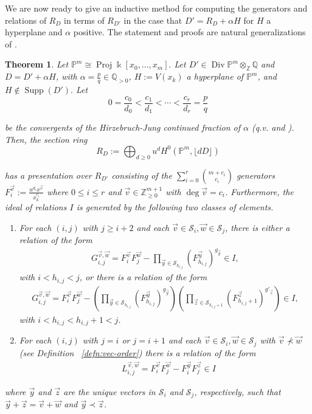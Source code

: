 \documentclass{amsart}
\theoremstyle{plain}
\newtheorem{thm}{Theorem}[subsection]
\theoremstyle{definition}
\theoremstyle{remark}
\numberwithin{equation}{section}
\newcommand\bq{{\mathbb Q}}
\newcommand\bp{{\mathbb P}}
\newcommand\bz{{\mathbb Z}}
\newcommand\bk{{\Bbbk}}
\DeclareMathOperator\di{Div}
\newcommand\mss{\mathscr{S}}
\DeclareMathOperator{\supp}{Supp}
\DeclareMathOperator{\proj}{Proj}
\begin{document}
We are now ready to give an inductive method for computing
the generators and relations of $R_D$ in terms of $R_{D'}$ 
in the case that $D' = R_D + \alpha H$ for $H$ a hyperplane and
$\alpha$ positive.
The statement and proofs are natural generalizations of
\cite[Theorem 6]{dorney:canonical}.


\begin{thm}
\label{thm:proj-one-point}
Let $\bp^m \cong \proj \bk [x_0, \ldots, x_m].$ Let $D' \in \di \bp^m \otimes_\bz \bq$ and $D = D' + \alpha H$, with $\alpha =
\frac{p}{q} \in \bq_{>0}$, $H := V(x_k)$ a hyperplane of $\bp^m$,
and $H \notin \supp(D').$
Let
\[
	0 = \frac{c_0}{d_0} <
	\frac{c_1}{d_1} < \cdots < \frac{c_r}{d_r} = \frac{p}{q}
\]

\noindent
be the convergents of the Hirzebruch-Jung continued fraction of
$\alpha$ (q.v. \cite[Section 2]{voight:cf} and \cite[Section 3]{hirzebruch:cf}). Then, the section ring
\[
	R_D := \bigoplus_{d \geq 0} u^d H^0(\bp^m, \lfloor dD \rfloor)
\]

\noindent
has a presentation over $R_{D'}$ consisting of the $\sum_{i = 0}^{r}
{{m + c_i} \choose {c_i}}$ generators $F_i^{\vec{v}} := \frac{u^{d_i}
x^{\vec{v}}}{x_k^{c_i}}$ where $0 \leq i \leq r$ and $\vec{v} \in \bz_{\geq 0}^{m + 1}$
with $\deg \vec v = c_i$. Furthermore, the ideal of
relations $I$ is generated by the following two classes of elements.
\begin{enumerate}
	\item For each $(i, j)$ with $j \geq i + 2$ and each $\vec{v} \in \mss_i,
		\vec{w} \in \mss_j$, there is either a relation of the form
		\begin{align*}
			G_{i, j}^{\vec{v}, \vec{w}} = F_i^{\vec{v}} F_j^{\vec{w}}
			- \prod_{\vec{y} \in \mss_{h_{i, j}}} (F_{h_{i, j}}^{\vec{y}})
			^{g_{\vec{y}}} \in I,
		\end{align*}
		with $i < h_{i, j} < j$, or there is a relation of the form
		\begin{align*}
			G_{i, j}^{\vec{v}, \vec{w}} = F_i^{\vec{v}} F_j^{\vec{w}}
			- \left( \prod_{\vec{y} \in \mss_{h_{i, j}}} (F_{h_{i, j}}^{\vec{y}})^{g_{\vec{y}}}
			\right) \left( \prod_{ \vec{z} \in
			\mss_{h_{i, j} + 1}} (F_{h_{i, j} + 1}^{\vec{z}})^{g'_{\vec{z}}} \right) \in I,
		\end{align*}
		with $i < h_{i, j} < h_{i, j} + 1 < j$.
	\item For each $(i, j)$ with
		$j = i$ or $j = i + 1$ and each $\vec{v} \in \mss_i, \vec{w} \in
		\mss_j$ with $\vec{v} \not\prec \vec{w}$ (see Definition
		~\ref{defn:vec-order}) there is a relation of the form
		\begin{align*}
			&L_{i, j}^{\vec{v}, \vec{w}} = F_i^{\vec{v}} F_j^{\vec{w}}
			- F_i^{\vec{y}} F_j^{\vec{z}} \in I
		\end{align*}

\end{enumerate}

\noindent
{}
where $\vec{y}$ and $\vec{z}$ are the unique
vectors in $\mss_i$ and $\mss_j$, respectively, such that $\vec{y}
+ \vec{z} = \vec{v} + \vec{w}$ and $\vec{y} \prec \vec{z}$.
\end{thm}
\end{document}
